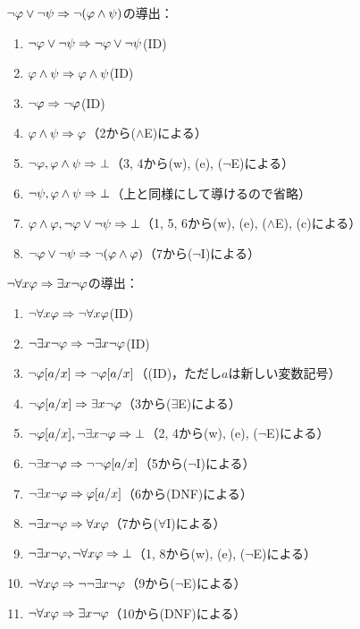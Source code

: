 \(\lnot \varphi \lor \lnot \psi \sequent \lnot \paren{\varphi \land \psi}\)の導出：
\begin{enumerate}
	\item \(\lnot \varphi \lor \lnot \psi \Rightarrow \lnot \varphi \lor \lnot \psi\)\quad (ID)
	\item \(\varphi \land \psi \Rightarrow \varphi \land \psi\)\quad (ID)
	\item \(\lnot \varphi \Rightarrow \lnot \varphi\)\quad (ID)
	\item \(\varphi \land \psi \Rightarrow \varphi\)\quad （2から(\(\land\)E)による）
	\item \(\lnot \varphi, \varphi \land \psi \Rightarrow \bot\)\quad （3, 4から(w), (e), (\(\lnot\)E)による）
	\item \(\lnot \psi, \varphi \land \psi \Rightarrow \bot\)\quad （上と同様にして導けるので省略）
	\item \(\varphi \land \varphi, \lnot \varphi \lor \lnot \psi \Rightarrow \bot\)\quad （1, 5, 6から(w), (e), (\(\land\)E), (c)による）
	\item \(\lnot \varphi \lor \lnot \psi \sequent \lnot \paren{\varphi \land \varphi}\)\quad （7から(\(\lnot\)I)による）
\end{enumerate}

\(\lnot \forall x \varphi \Rightarrow \exists x \lnot \varphi\)の導出：
\begin{enumerate}
	\item \(\lnot \forall x \varphi \Rightarrow \lnot \forall x \varphi\)\quad (ID)
	\item \(\lnot \exists x \lnot \varphi \Rightarrow \lnot \exists x \lnot \varphi\)\quad (ID)
	\item \(\lnot \subst{\varphi}{a/x} \sequent \lnot \subst{\varphi}{a/x}\)\quad （(ID)，ただし\(a\)は新しい変数記号）
	\item \(\lnot \subst{\varphi}{a/x} \sequent \exists x \lnot \varphi\)\quad （3から(\(\exists\)E)による）
	\item \(\lnot \subst{\varphi}{a/x}, \lnot \exists x \lnot \varphi \sequent \bot\)\quad （2, 4から(w), (e), (\(\lnot\)E)による）
	\item \(\lnot \exists x \lnot \varphi \sequent \lnot \lnot \subst{\varphi}{a/x}\)\quad （5から(\(\lnot\)I)による）
	\item \(\lnot \exists x \lnot \varphi \sequent \subst{\varphi}{a/x}\)\quad （6から(DNF)による）
	\item \(\lnot \exists x \lnot \varphi \Rightarrow \forall x \varphi\)\quad （7から(\(\forall\)I)による）
	\item \(\lnot \exists x \lnot \varphi, \lnot \forall x \varphi \Rightarrow \bot\)\quad （1, 8から(w), (e), (\(\lnot\)E)による）
	\item \(\lnot \forall x \varphi \Rightarrow \lnot \lnot \exists x \lnot \varphi\)\quad （9から(\(\lnot\)E)による）
	\item \(\lnot \forall x \varphi \Rightarrow \exists x \lnot \varphi\)\quad （10から(DNF)による）
\end{enumerate}

